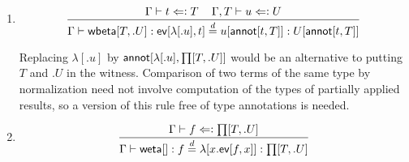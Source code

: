 \documentclass[11pt]{article}
\newcommand{\eqd}{\stackrel{d}{=}}
\newcommand{\spc}{{\,\,\,\,\,\,\,}}
\newcommand{\ccheck}{\Leftarrow\vcentcolon}
\newcommand{\ha}[2]{#1[#2]}
\newcommand{\weta}{{\sf weta}}
\newcommand{\annot}{{\sf annot}}
\newcommand{\ev}{{\sf ev}}
\newcommand{\wbeta}{{\sf wbeta}}
\begin{document}
\begin{enumerate}
\item 
$$\frac{ \Gamma\vdash t \ccheck T\spc \Gamma, T\vdash u \ccheck U}{\Gamma\vdash \ha\wbeta{T,.U} : \ha\ev{\ha\lambda{.u},t} \eqd u[\ha\annot{t,T}] : U[\ha\annot{t,T}]}$$

Replacing $\ha\lambda{.u}$ by $\ha\annot{\ha\lambda{.u},\ha\prod{T,.U}}$ would
be an alternative to putting $T$ and $.U$ in the witness.  Comparison of two
terms of the same type by normalization need not involve computation of the
types of partially applied results, so a version of this rule free of type
annotations is needed.

\item 
$$\frac{\Gamma\vdash f \ccheck \ha\prod{T,.U}}{\Gamma\vdash \ha\weta{} : f \eqd \ha\lambda{x.\ha\ev{f,x}} : \ha\prod{T,.U}}$$ 

\end{enumerate}



\end{document}
